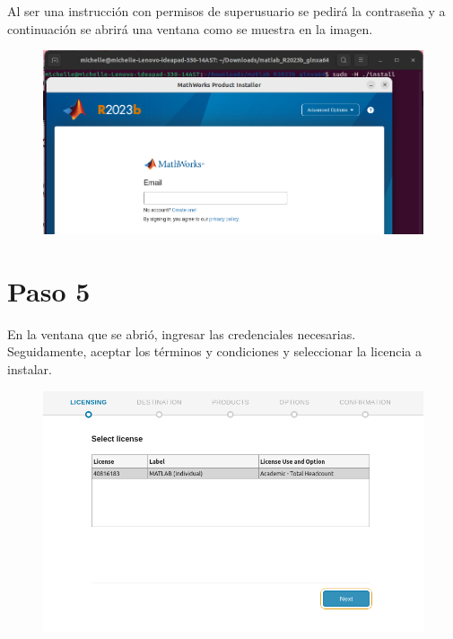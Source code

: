 \documentclass{article}
\begin{document}
Al ser una instrucción con permisos de superusuario se pedirá la contraseña y a continuación se abrirá una ventana como se muestra en la imagen. 

\begin{figure}[ht]
\centering
\includegraphics[width=1\textwidth]{cuatro.png}
\end{figure}
\newpage
\section*{Paso 5}
En la ventana que se abrió, ingresar las credenciales necesarias.\\

Seguidamente, aceptar los términos y condiciones y seleccionar la licencia a instalar. \\
\begin{figure}[ht]
\centering
\includegraphics[width=1\textwidth]{cinco.png}
\end{figure}
\end{document}
